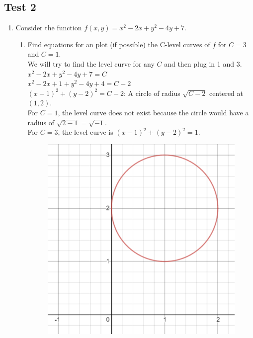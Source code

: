 \subsection{Test 2}
\begin{enumerate}
	\item Consider the function $f(x,y) = x^2 - 2x + y^2 - 4y + 7$.\\
	\begin{enumerate}[label=\alph*.]
		\item Find equations for an plot (if possible) the C-level curves of $f$ for $C = 3$ and $C = 1$.\\
		\indent
		We will try to find the level curve for any $C$ and then plug in 1 and 3.\\
		$x^2 - 2x + y^2 - 4y + 7 = C$\\
		$x^2 - 2x + 1 + y^2 - 4y + 4 = C-2$\\
		$(x-1)^2 + (y-2)^2 = C-2$: A circle of radius $\sqrt{C-2}$ centered at $(1,2)$.\\
		For $C = 1$, the level curve does not exist because the circle would have a radius of $\sqrt{2-1} = \sqrt{-1}$.\\
		For $C = 3$, the level curve is $(x-1)^2 + (y-2)^2 = 1$.
		
		\begin{figure}[h]
			\centering
			\includegraphics[scale=.24]{Images/additionalMaterials/test2_circle}
		\end{figure}
		

\end{enumerate}
\end{enumerate}
